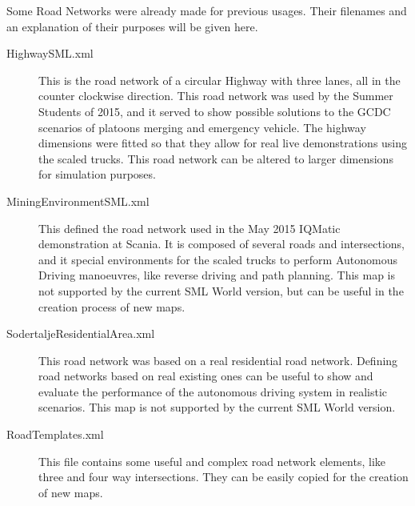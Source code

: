 Some Road Networks were already made for previous usages. Their filenames and an explanation of their purposes will be given here.

\begin{description}

\item[HighwaySML.xml] This is the road network of a circular Highway with three lanes, all in the counter clockwise direction. This road network was used by the Summer Students of 2015, and it served to show possible solutions to the GCDC scenarios of platoons merging and emergency vehicle. The highway dimensions were fitted so that they allow for real live demonstrations using the scaled trucks. This road network can be altered to larger dimensions for simulation purposes.
\item[MiningEnvironmentSML.xml] This defined the road network used in the May 2015 IQMatic demonstration at Scania. It is composed of several roads and intersections, and it special environments for the scaled trucks to perform Autonomous Driving manoeuvres, like reverse driving and path planning. This map is not supported by the current SML World version, but can be useful in the creation process of new maps.
\item[SodertaljeResidentialArea.xml] This road network was based on a real residential road network. Defining road networks based on real existing ones can be useful to show and evaluate the performance of the autonomous driving system in realistic scenarios. This map is not supported by the current SML World version.
\item[RoadTemplates.xml] This file contains some useful and complex road network elements, like three and four way intersections. They can be easily copied for the creation of new maps.
\end{description}

